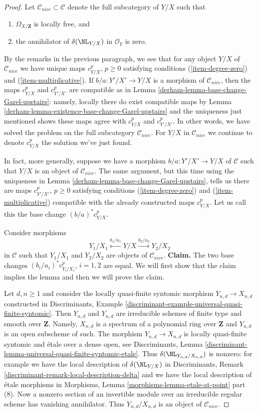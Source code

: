 \begin{proof}
\medskip\noindent
Let $\mathcal{C}_{nice} \subset \mathcal{C}$ denote the full subcategory
of $Y/X$ such that
\begin{enumerate}
\item $\Omega_{X/\mathbf{Z}}$ is locally free, and
\item the annihilator of $\delta(\NL_{Y/X})$ in $\mathcal{O}_Y$ is zero.
\end{enumerate}
By the remarks in the previous paragraph, we see that for any
object $Y/X$ of $\mathcal{C}_{nice}$ we have unique maps
$c^p_{Y/X}$, $p \geq 0$ satisfying conditions (\ref{item-degree-zero})
and (\ref{item-multiplicative}). If $b/a : Y'/X' \to Y/X$
is a morphism of $\mathcal{C}_{nice}$, then the maps
$c^p_{Y/X}$ and $c^p_{Y'/X'}$ are compatible as in
Lemma \ref{derham-lemma-base-change-Garel-upstairs}: namely,
locally there do exist compatible maps by
Lemma \ref{derham-lemma-existence-base-change-Garel-upstairs}
and the uniqueness just mentioned shows these maps agree
with $c^p_{Y/X}$ and $c^p_{Y'/X'}$.
In other words, we have solved the problem
on the full subcategory $\mathcal{C}_{nice}$. For $Y/X$ in $\mathcal{C}_{nice}$
we continue to denote $c^p_{Y/X}$ the solution we've just found.

\medskip\noindent
In fact, more generally, suppose we have a morphism $b/a : Y'/X' \to Y/X$
of $\mathcal{C}$ such that $Y/X$ is an object of $\mathcal{C}_{nice}$.
The same argument, but this time using the uniqueness in
Lemma \ref{derham-lemma-base-change-Garel-upstairs}, tells us there are
maps $c^p_{Y'/X'}$, $p \geq 0$  satisfying conditions (\ref{item-degree-zero})
and (\ref{item-multiplicative}) compatible with the already constructed
maps $c^p_{Y/X}$. Let us call this the base change
$(b/a)^*c^p_{Y/X}$.

\medskip\noindent
Consider morphisms
$$
Y_1/X_1 \xleftarrow{b_1/a_1} Y/X \xrightarrow{b_2/a_2} Y_2/X_2
$$
in $\mathcal{C}$ such that $Y_1/X_1$ and $Y_2/X_2$ are objects
of $\mathcal{C}_{nice}$.
{\bf Claim.} The two base changes $(b_i/a_i)^*c^p_{Y_i/X_i}$, $i = 1, 2$
are equal. We will first show that the claim implies the lemma
and then we will prove the claim.

\medskip\noindent
Let $d, n \geq 1$ and consider the locally
quasi-finite syntomic morphism $Y_{n, d} \to X_{n, d}$
constructed in Discriminants, Example
\ref{discriminant-example-universal-quasi-finite-syntomic}.
Then $Y_{n, d}$ and $Y_{n, d}$ are irreducible schemes of finite type and
smooth over $\mathbf{Z}$. Namely, $X_{n, d}$ is a spectrum of a
polynomial ring over $\mathbf{Z}$ and $Y_{n, d}$ is an open subscheme
of such. The morphism $Y_{n, d} \to X_{n, d}$ is locally quasi-finite syntomic
and \'etale over a dense open, see Discriminants, Lemma
\ref{discriminant-lemma-universal-quasi-finite-syntomic-etale}.
Thus $\delta(\NL_{Y_{n, d}/X_{n, d}})$ is nonzero: for example we have
the local description of $\delta(\NL_{Y/X})$ in
Discriminants, Remark \ref{discriminant-remark-local-description-delta}
and we have the local description of \'etale morphisms in
Morphisms, Lemma \ref{morphisms-lemma-etale-at-point} part (8).
Now a nonzero section of an invertible module over an irreducible
regular scheme has vanishing annihilator. Thus
$Y_{n, d}/X_{n, d}$ is an object of $\mathcal{C}_{nice}$.


\end{proof}
